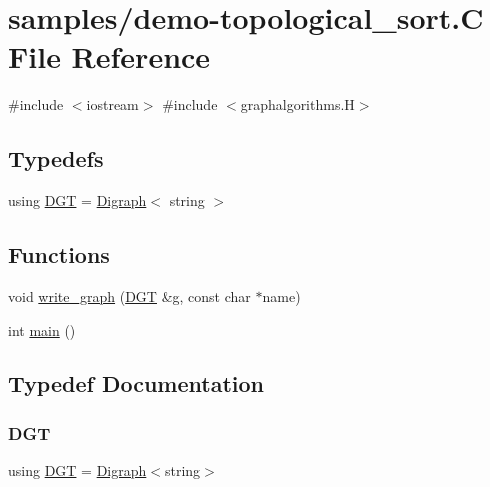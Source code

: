\hypertarget{demo-topological__sort_8_c}{}\section{samples/demo-\/topological\+\_\+sort.C File Reference}
\label{demo-topological__sort_8_c}
{\ttfamily \#include $<$iostream$>$}\newline
{\ttfamily \#include $<$graphalgorithms.\+H$>$}\newline
\subsection*{Typedefs}
\begin{DoxyCompactItemize}
\item 
using \hyperlink{demo-topological__sort_8_c_a8f123599e859454680bf37e203c0b18b}{D\+GT} = \hyperlink{class_designar_1_1_digraph}{Digraph}$<$ string $>$
\end{DoxyCompactItemize}
\subsection*{Functions}
\begin{DoxyCompactItemize}
\item 
void \hyperlink{demo-topological__sort_8_c_ab82a33da73b0e5278780967809b0791d}{write\+\_\+graph} (\hyperlink{demo-buildgraph_8_c_ae73e956c2a8cf0a58255aa6b659985e0}{D\+GT} \&g, const char $\ast$name)
\item 
int \hyperlink{demo-topological__sort_8_c_ae66f6b31b5ad750f1fe042a706a4e3d4}{main} ()
\end{DoxyCompactItemize}


\subsection{Typedef Documentation}
\mbox{\label{demo-topological__sort_8_c_a8f123599e859454680bf37e203c0b18b}} 
\subsubsection{\texorpdfstring{D\+GT}{DGT}}
{\footnotesize\ttfamily using \hyperlink{demo-buildgraph_8_c_ae73e956c2a8cf0a58255aa6b659985e0}{D\+GT} =  \hyperlink{class_designar_1_1_digraph}{Digraph}$<$string$>$}



